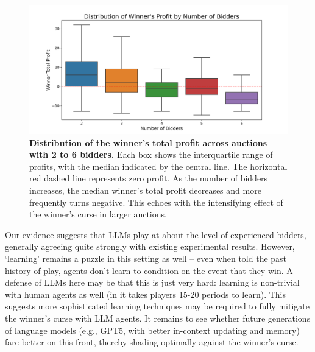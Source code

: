 \documentclass{article} %
\newcommand{\TK}[1]{\textcolor{red}{TK: #1}}
\begin{document}
\begin{figure}[h]  %
    
    \centering  %
    \includegraphics[width=\linewidth]{Figs/cv_plot.png}  %
    \caption{\textbf{Distribution of the winner’s total profit across auctions with 2 to 6 bidders.} Each box shows the interquartile range of profits, with the median indicated by the central line. The horizontal red dashed line represents zero profit. As the number of bidders increases, the median winner's total profit decreases and more frequently turns negative. This echoes with the intensifying effect of the winner's curse in larger auctions.}
    \label{fig:winner}

\end{figure}


Our evidence suggests that LLMs play at about the level of experienced bidders, generally agreeing quite strongly with existing experimental results. 
However, `learning' remains a puzzle in this setting as well -- even when told the past history of play, agents don't learn to condition on the event that they win. 
A defense of LLMs here may be that this is just very hard: learning is non-trivial with human agents as well (in \citet{kagel1986winner} it takes players 15-20 periods to learn). 
This suggests more sophisticated learning techniques may be required to fully mitigate the winner's curse with LLM agents. 
It remains to see whether future generations of language models (e.g., GPT5, with better in-context updating and memory) fare better on this front, thereby shading optimally against the winner's curse.



\end{document}
